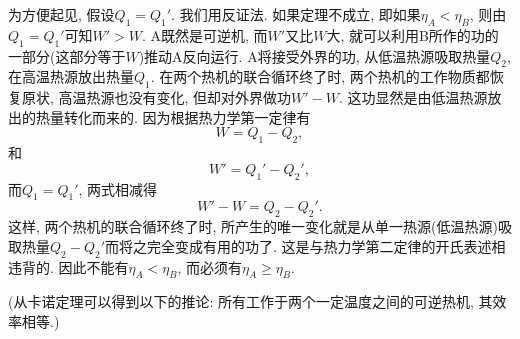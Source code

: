 \begin{questions}
\begin{solution}
    为方便起见, 假设$Q_1=Q_1'$. 我们用反证法. 如果定理不成立, 即如果$\eta_A<\eta_B$, 则由$Q_1=Q_1'$可知$W'>W$. A既然是可逆机, 而$W'$又比$W$大, 就可以利用B所作的功的一部分(这部分等于$W$)推动A反向运行. A将接受外界的功, 从低温热源吸取热量$Q_2$, 在高温热源放出热量$Q_1$. 在两个热机的联合循环终了时, 两个热机的工作物质都恢复原状, 高温热源也没有变化, 但却对外界做功$W'-W$. 这功显然是由低温热源放出的热量转化而来的. 因为根据热力学第一定律有
    \begin{equation}
      W = Q_1 - Q_2,
    \end{equation}
    和
    \begin{equation}
      W' = Q_1' - Q_2',
    \end{equation}
    而$Q_1=Q_1'$, 两式相减得
    \begin{equation}
      W'-W = Q_2 - Q_2'.
    \end{equation}
    这样, 两个热机的联合循环终了时, 所产生的唯一变化就是从单一热源(低温热源)吸取热量$Q_2-Q_2'$而将之完全变成有用的功了. 这是与热力学第二定律的开氏表述相违背的. 因此不能有$\eta_A<\eta_B$, 而必须有$\eta_A\ge\eta_B$.

    (从卡诺定理可以得到以下的推论: 所有工作于两个一定温度之间的可逆热机, 其效率相等.)
  \end{solution}
\end{questions}